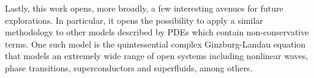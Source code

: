 Lastly, this work opens, more broadly,
a few interesting avenues for future explorations.
In particular, it opens the possibility to apply a similar methodology
to other models described by PDEs which
contain non-conservative terms.  
%
One such model is the quintessential complex Ginzburg-Landau
equation~\cite{Aranson:02} that models an extremely wide
range of open systems including nonlinear waves, phase transitions,
superconductors and superfluids, among others.


